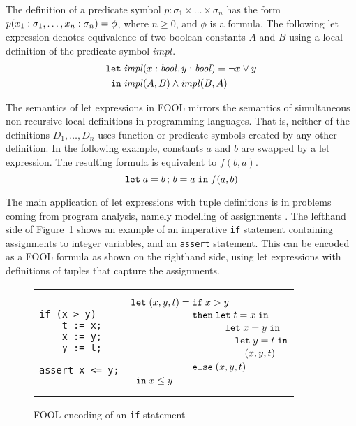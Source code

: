 \documentclass{easychair}
\begin{document}
The definition of a predicate symbol $p:\sigma_1\times\ldots\times\sigma_n$ has 
the form ${p(x_1:\sigma_1,\ldots,x_n:\sigma_n)}={\phi}$, where 
$n \geq 0$, and $\phi$ is a formula.
The following let expression denotes equivalence of two boolean constants 
$A$ and $B$ using a local definition of the predicate symbol $\mathit{impl}$.
\begin{equation}\label{eq:fool-let-impl}
\begin{aligned}
\mathtt{let}\;&{\mathit{impl}(x:\mathit{bool},y:\mathit{bool})}={\neg x \lor y}\\
 \mathtt{in}\;&\mathit{impl}(A,B)\wedge\mathit{impl}(B,A)
\end{aligned}
\end{equation}

The semantics of let expressions in FOOL mirrors the semantics of
simultaneous non-recursive local definitions in programming languages. That is,
neither of the definitions $D_1,\ldots,\allowbreak D_n$ uses function or
predicate symbols created by any other definition. In the following example,
constants $a$ and $b$ are swapped by a let expression. The resulting formula
is equivalent to $f(b, a)$.
\begin{equation}\label{eq:parallel-let-example}
\mathtt{let}\;{a}={b}\,;\,{b}={a}\;\mathtt{in}\;f(a, b)
\end{equation}

The main application of let expressions with tuple definitions is in 
problems coming from program analysis, namely modelling of assignments
\cite{KKV18}.
The lefthand side of Figure~\ref{fig:simple-if} shows an example of an 
imperative \texttt{if} statement containing assignments to integer variables, 
and an \texttt{assert} statement. 
This can be encoded as a FOOL formula as shown on the righthand side, using 
let expressions with definitions of tuples that capture the assignments.

\begin{figure}[htbp]
\begin{center}
\begin{tabular}[t]{ll}
\begin{minipage}{0.3\textwidth}
\begin{verbatim}
if (x > y) 
    t := x;
    x := y;
    y := t;

assert x <= y;
\end{verbatim}
\end{minipage}
&
\begin{minipage}{0.3\textwidth}
\[
  \letnl{(x,y,t)}{\itenll{x > y}
                 {\letinnl{t}{x}
                          {\letinnl{x}{y}
                                   {\letinnl{y}{t}
                                            {(x,y,t)}}}}
                 {(x,y,t)}}
        {x \le y}
\]
\end{minipage}
\\
\end{tabular}
\end{center}
\caption{FOOL encoding of an {\tt if} statement}
\label{fig:simple-if}
\end{figure}
\end{document}
